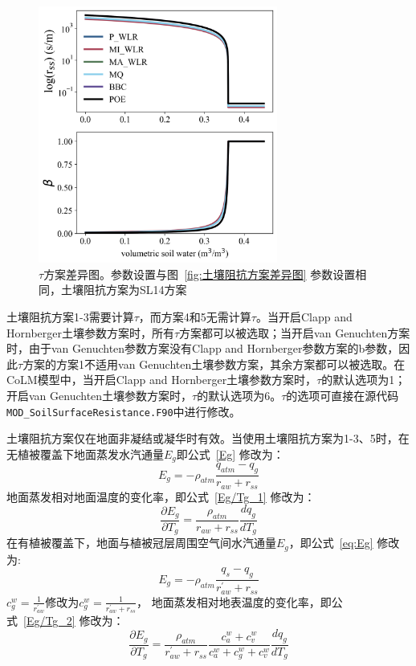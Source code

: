 {
\begin{figure}[htb]
\centering
\includegraphics[width=0.7\textwidth]{Figures/地表湍流交换过程/tau方案差异图.png}
\caption[\(\ \tau\)方案差异图]{$\tau$方案差异图。参数设置与图~\ref{fig:土壤阻抗方案差异图} 参数设置相同，土壤阻抗方案为SL14方案}
\label{fig:tau方案差异图}
\end{figure}
}

土壤阻抗方案1-3需要计算\(\tau\)，而方案4和5无需计算\(\tau\)。当开启Clapp and Hornberger土壤参数方案时，所有\(\tau\)方案都可以被选取；当开启van Genuchten方案时，由于van Genuchten参数方案没有Clapp and Hornberger参数方案的b参数，因此\(\tau\)方案的方案1不适用van Genuchten土壤参数方案，其余方案都可以被选取。在CoLM模型中，当开启Clapp and Hornberger土壤参数方案时，\(\tau\)的默认选项为1；开启van Genuchten土壤参数方案时，\(\tau\)的默认选项为6。\(\tau\)的选项可直接在源代码\texttt{MOD\_SoilSurfaceResistance.F90}中进行修改。

土壤阻抗方案仅在地面非凝结或凝华时有效。当使用土壤阻抗方案为1-3、5时，在无植被覆盖下地面蒸发水汽通量\(E_{g}\)即公式~\eqref{Eg} 修改为：
\begin{equation}
E_{g}=-\rho_{atm} \frac{q_{atm}-q_{g}}{r_{a w} + r_{s s}}
\end{equation}
地面蒸发相对地面温度的变化率，即公式~\eqref{Eg/Tg_1} 修改为：
\begin{equation}
     \frac{\partial E_{g}}{\partial T_{g}}= \frac{\rho_{atm}}{r_{a w} + r_{s s}} \frac{d q_{g}}{d T_{g}}
\end{equation}
在有植被覆盖下，地面与植被冠层周围空气间水汽通量\(E_{g}\)，即公式~\eqref{eq:Eg} 修改为:
\begin{equation}
E_{g}=-\rho_{atm} \frac{q_{s}-q_{g}}{r_{a w}^{\prime}+r_{ss}}
\end{equation}
$c_g^w=\frac{1}{r_{aw}^\prime}$修改为$c_g^w=\frac{1}{r_{aw} ^\prime+r_{ss}}$，
地面蒸发相对地表温度的变化率，即公式~\eqref{Eg/Tg_2} 修改为：
\begin{equation}
\frac{\partial E_{g}}{\partial T_{g}}=
      \frac{\rho_{atm}}{r_{a w}^{\prime} + r_{s s}} \frac{c_{a}^{w}+c_{v}^{w}}{c_{a}^{w}+c_{g}^{w}+c_{v}^{w}} \frac{d q_{g}}{d T_{g}}
\end{equation}

